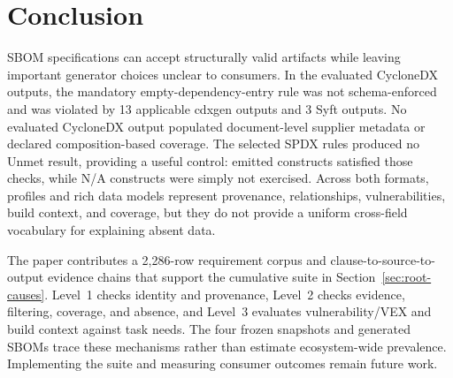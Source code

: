 \section{Conclusion}
\label{sec:conclusion}

SBOM specifications can accept structurally valid artifacts while leaving important generator choices unclear to consumers. In the evaluated CycloneDX outputs, the mandatory empty-dependency-entry rule was not schema-enforced and was violated by 13 applicable cdxgen outputs and 3 Syft outputs. No evaluated CycloneDX output populated document-level supplier metadata or declared composition-based coverage. The selected SPDX rules produced no Unmet result, providing a useful control: emitted constructs satisfied those checks, while N/A constructs were simply not exercised. Across both formats, profiles and rich data models represent provenance, relationships, vulnerabilities, build context, and coverage, but they do not provide a uniform cross-field vocabulary for explaining absent data.

The paper contributes a 2,286-row requirement corpus and clause-to-source-to-output evidence chains that support the cumulative suite in Section~\ref{sec:root-causes}. Level~1 checks identity and provenance, Level~2 checks evidence, filtering, coverage, and absence, and Level~3 evaluates vulnerability/VEX and build context against task needs. The four frozen snapshots and generated SBOMs trace these mechanisms rather than estimate ecosystem-wide prevalence. Implementing the suite and measuring consumer outcomes remain future work.
